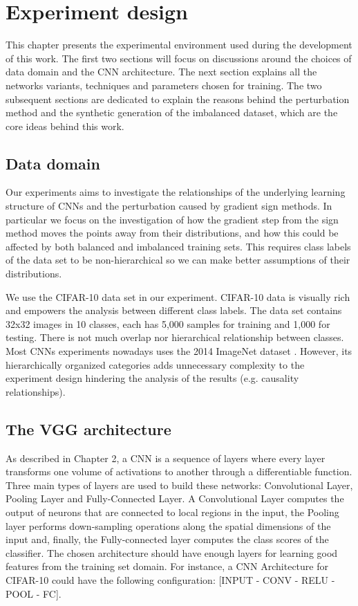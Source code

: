 \chapter{Experiment design} \label{chap:experiment}

This chapter presents the experimental environment used during the development of this work. The first two sections will focus on discussions around the choices of data domain and the CNN architecture. The next section explains all the networks variants, techniques and parameters chosen for training. The two subsequent sections are dedicated to explain the reasons behind the perturbation method and the synthetic generation of the imbalanced dataset, which are the core ideas behind this work.
\section{Data domain}

Our experiments aims to investigate the relationships of the underlying learning structure of CNNs and the perturbation caused by gradient sign methods. In particular we focus on the investigation of how the gradient step from the sign method moves the points away from their distributions, and how this could be affected by both balanced and imbalanced training sets. This requires  class labels of the data set to be non-hierarchical so we can make better assumptions of their distributions. 

We use the CIFAR-10 data set \cite{krizhevsky_2009} in our experiment. CIFAR-10 data is visually rich and empowers the analysis between different class labels. The data set contains 32x32 images in 10 classes, each has 5,000 samples for training and 1,000 for testing. There is not much overlap nor hierarchical relationship between classes. Most CNNs experiments nowadays uses the 2014 ImageNet dataset \cite{deng2009imagenet}. However, its hierarchically organized categories adds unnecessary complexity to the experiment design hindering the analysis of the results (e.g. causality relationships).
\section{The VGG architecture}

As described in Chapter 2, a CNN is a sequence of layers where every layer transforms one volume of activations to another through a differentiable function. Three main types of layers are used to build these networks: Convolutional Layer, Pooling Layer and Fully-Connected Layer. A Convolutional Layer computes the output of neurons that are connected to local regions in the input, the Pooling layer performs down-sampling operations along the spatial dimensions of the input and, finally, the Fully-connected layer computes the class scores of the classifier. The chosen architecture should have enough layers for learning good features from the training set domain. For instance, a CNN Architecture for CIFAR-10 could have the following configuration: [INPUT - CONV - RELU - POOL - FC].

